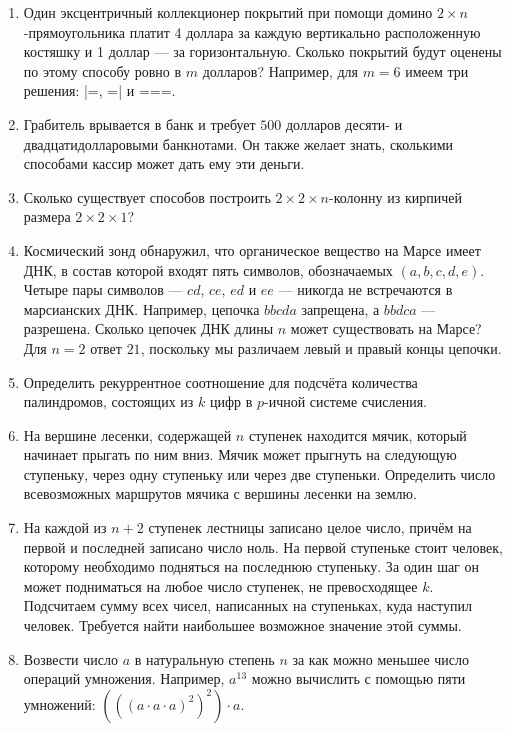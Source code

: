 \begin{enumerate}
\item Один эксцентричный коллекционер покрытий при помощи домино $2 \times n$-прямоугольника
платит 4 доллара за каждую вертикально расположенную костяшку и 1 доллар --- за горизонтальную.
Сколько покрытий будут оценены по этому способу ровно в $m$ долларов? Например, для $m=6$ имеем
три решения: |=, =| и ===.

\item Грабитель врывается в банк и требует $500$ долларов десяти- и двадцатидолларовыми банкнотами.
      Он также желает знать, сколькими способами кассир может дать ему эти деньги.

\item Сколько существует способов построить $2 \times 2 \times n$-колонну из кирпичей
      размера $2 \times 2 \times 1$?
      
\item Космический зонд обнаружил, что органическое вещество на Марсе имеет ДНК, в состав
      которой входят пять символов, обозначаемых $(a, b, c, d, e)$. Четыре пары символов
      --- $cd$, $ce$, $ed$ и $ee$ --- никогда не встречаются в марсианских ДНК.
      Например, цепочка $bbcda$ запрещена, а $bbdca$ --- разрешена.
      Сколько цепочек ДНК длины $n$ может существовать на Марсе?
      Для $n=2$ ответ $21$, поскольку мы различаем левый и правый концы цепочки.

\item Определить рекуррентное соотношение для подсчёта количества палиндромов, состоящих
      из $k$ цифр в $p$-ичной системе счисления.
      
\item На вершине лесенки, содержащей $n$ ступенек находится мячик, который начинает прыгать
      по ним вниз. Мячик может прыгнуть на следующую ступеньку, через одну ступеньку или
      через две ступеньки. Определить число всевозможных маршрутов мячика с вершины
      лесенки на землю.
      
\item На каждой из $n+2$ ступенек лестницы записано целое число, причём на первой и последней
      записано число ноль. На первой ступеньке стоит человек, которому необходимо подняться
      на последнюю ступеньку. За один шаг он может подниматься на любое число ступенек,
      не превосходящее $k$. Подсчитаем сумму всех чисел, написанных на ступеньках, куда
      наступил человек. Требуется найти наибольшее возможное значение этой суммы.

\item Возвести число $a$ в натуральную степень $n$ за как можно меньшее число операций
      умножения. Например, $a^{13}$ можно вычислить с помощью пяти умножений:
      $(((a\cdot a \cdot a)^2)^2)\cdot a$.

\end{enumerate}
